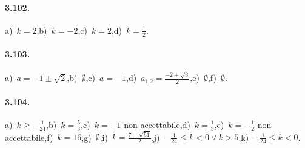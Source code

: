 \paragraph{3.102.} a)~$ k = 2 $,\quad b)~$ k = -2 $,\quad c)~$ k = 2 $,\quad d)~$ k = \frac{1}{2} $.

\paragraph{3.103.} a)~$ a =-1 \pm \sqrt{2} $,\quad b)~$ \emptyset $,\quad c)~$ a =-1 $,\quad d)~$ a_{1.2} =\frac{- 2 \pm \sqrt{3}}{2} $,\quad e)~$ \emptyset $,\quad f)~$ \emptyset $.

\paragraph{3.104.} a)~$ k \geq-\frac{1}{24} $,\quad b)~$ k = \frac{5}{3} $,\quad c)~$ k=-1 $ non accettabile,\quad d)~$ k = \frac{1}{3} $,\quad e)~$ k =-\frac{1}{2}$ non accettabile,\quad f)~$ k = 16 $,\quad g)~$ \emptyset $,\quad i)~$ k = \frac{7 \pm \sqrt{51}}{2} $,\quad j)~$ - \frac{1}{24} \leq k < 0 \vee k > 5 $,\quad k)~$ - \frac{1}{24} \leq k < 0 $.

